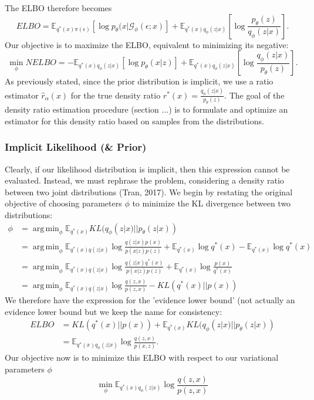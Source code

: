 \documentclass[a4paper,12pt]{article}
\DeclareMathOperator*{\argmin}{arg\,min}
\numberwithin{equation}{section}
\begin{document}
The ELBO therefore becomes
\[ELBO = \mathbb{E}_{q^*(x)\pi(\epsilon)}[\log p_\theta (x|\mathcal{G}_\phi(\epsilon;x)]+\mathbb{E}_{q^*(x)q_\phi(z|x)}\left[\log \frac{p_\theta(z)}{q_\phi(z|x)}\right].\]
Our objective is to maximize the ELBO, equivalent to minimizing its negative:
\[\min_\phi NELBO = -\mathbb{E}_{q^*(x)q_\phi(z|x)}\left[\log p_\theta(x|z)\right]+\mathbb{E}_{q^*(x)q_\phi(z|x)}\left[\log \frac{q_\phi(z|x)}{p_\theta(z)}\right].\]
As previously stated, since the prior distribution is implicit, we use a ratio estimator $\hat{r}_\alpha(x)$ for the true density ratio $r^*(x)=\frac{q_\phi(z|x)}{p_\theta(z)}$. The goal of the density ratio estimation procedure (section ...) is to formulate and optimize an estimator for this density ratio based on samples from the distributions.
\newpage
\subsubsection{Implicit Likelihood (\& Prior)}
Clearly, if our likelihood distribution is implicit, then this expression cannot be evaluated. Instead, we must rephrase the problem, considering a density ratio between two joint distributions  (Tran, 2017). We begin by restating the original objective of choosing parameters $\phi$ to minimize the KL divergence between two distributions:
\begin{align*}
\phi &=\argmin_\phi \mathbb{E}_{q^*(x)}KL(q_\phi(z|x)||p_\theta (z|x))\\
&=\argmin_\phi\mathbb{E}_{q^*(x)q(z|x)}\log \frac{q(z|x)p(x)}{p(x|z)p(z)}+\mathbb{E}_{q^*(x)}\log q^*(x)-\mathbb{E}_{q^*(x)}\log q^*(x)\\
&=\argmin_\phi\mathbb{E}_{q^*(x)q(z|x)}\log \frac{q(z|x)q^*(x)}{p(x|z)p(z)}+\mathbb{E}_{q^*(x)}\log \frac{p(x)}{q^*(x)}\\
&= \argmin_\phi\mathbb{E}_{q^*(x)q(z|x)}\log \frac{q(z,x)}{p(z,x)}-KL(q^*(x)||p(x))
\end{align*}
We therefore have the expression for the 'evidence lower bound' (not actually an evidence lower bound but we keep the name for consistency:
\begin{align*}
ELBO &= KL(q^*(x)||p(x))+\mathbb{E}_{q^*(x)}KL(q_\phi(z|x)||p_\theta(z|x))\\
&=\mathbb{E}_{q^*(x)q_\phi(z|x)}\log \frac{q(z,x)}{p(x,z)}.
\end{align*}
Our objective now is to minimize this ELBO with respect to our variational parameters $\phi$
\[\min_\phi \mathbb{E}_{q^*(x)q_\phi(z|x)}\log \frac{q(z,x)}{p(z,x)}\]
\end{document}
